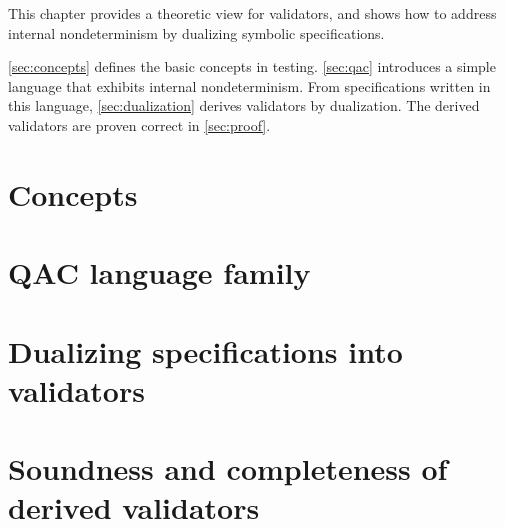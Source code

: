 This chapter provides a theoretic view for validators, and shows how to address
internal nondeterminism by dualizing symbolic specifications.

\autoref{sec:concepts} defines the basic concepts in testing.  \autoref{sec:qac}
introduces a simple language that exhibits internal nondeterminism.  From
specifications written in this language, \autoref{sec:dualization} derives
validators by dualization.  The derived validators are proven correct
in \autoref{sec:proof}.

\section{Concepts}
\label{sec:concepts}


\section{QAC language family}
\label{sec:qac}


\section{Dualizing specifications into validators}
\label{sec:dualization}


\section{Soundness and completeness of derived validators}
\label{sec:proof}


